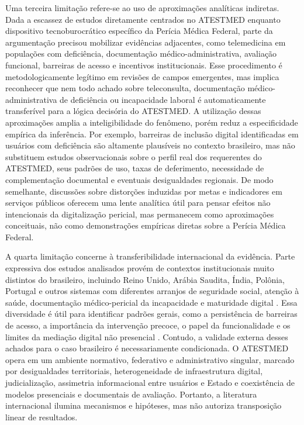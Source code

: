 \documentclass[12pt,a4paper]{article}
\begin{document}
Uma terceira limitação refere-se ao uso de aproximações analíticas indiretas. Dada a escassez de estudos diretamente centrados no ATESTMED enquanto dispositivo tecnoburocrático específico da Perícia Médica Federal, parte da argumentação precisou mobilizar evidências adjacentes, como telemedicina em populações com deficiência, documentação médico-administrativa, avaliação funcional, barreiras de acesso e incentivos institucionais. Esse procedimento é metodologicamente legítimo em revisões de campos emergentes, mas implica reconhecer que nem todo achado sobre teleconsulta, documentação médico-administrativa de deficiência ou incapacidade laboral é automaticamente transferível para a lógica decisória do ATESTMED. A utilização dessas aproximações amplia a inteligibilidade do fenômeno, porém reduz a especificidade empírica da inferência. Por exemplo, barreiras de inclusão digital identificadas em usuários com deficiência \parencite{albasheer2026telemedicineutilizationanddigitalinclusionamongpe,m2024astudyofdisabilityseveritybarriersandfacilitatingfactor} são altamente plausíveis no contexto brasileiro, mas não substituem estudos observacionais sobre o perfil real dos requerentes do ATESTMED, seus padrões de uso, taxas de deferimento, necessidade de complementação documental e eventuais desigualdades regionais. De modo semelhante, discussões sobre distorções induzidas por metas e indicadores em serviços públicos \parencite{kelman2009performanceimprovementandperformancedysfunctionanemp} oferecem uma lente analítica útil para pensar efeitos não intencionais da digitalização pericial, mas permanecem como aproximações conceituais, não como demonstrações empíricas diretas sobre a Perícia Médica Federal.

A quarta limitação concerne à transferibilidade internacional da evidência. Parte expressiva dos estudos analisados provém de contextos institucionais muito distintos do brasileiro, incluindo Reino Unido, Arábia Saudita, Índia, Polônia, Portugal e outros sistemas com diferentes arranjos de seguridade social, atenção à saúde, documentação médico-pericial da incapacidade e maturidade digital \parencite{gabbay2011niceguidanceonlongtermsicknessandincapacity,albasheer2026telemedicineutilizationanddigitalinclusionamongpe,rajasulochana2026doeshavingadisabilitycertificateensurebenefit,przysada2019anassessmentofworkabilityafterthecompletionofre,sa2020medicalcertificateofdisabilityadescriptiveanalysisofav}. Essa diversidade é útil para identificar padrões gerais, como a persistência de barreiras de acesso, a importância da intervenção precoce, o papel da funcionalidade e os limites da mediação digital não presencial \parencite{ftouni2022challengesoftelemedicineduringthecovid19pandemica,gabbay2011niceguidanceonlongtermsicknessandincapacity}. Contudo, a validade externa desses achados para o caso brasileiro é necessariamente condicionada. O ATESTMED opera em um ambiente normativo, federativo e administrativo singular, marcado por desigualdades territoriais, heterogeneidade de infraestrutura digital, judicialização, assimetria informacional entre usuários e Estado e coexistência de modelos presenciais e documentais de avaliação. Portanto, a literatura internacional ilumina mecanismos e hipóteses, mas não autoriza transposição linear de resultados.
\end{document}
